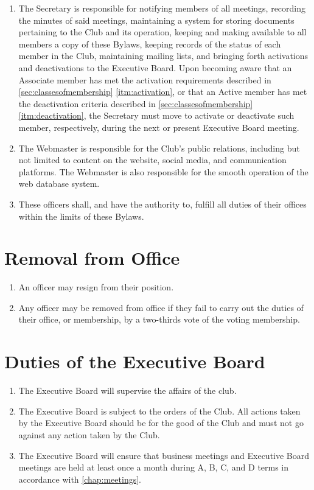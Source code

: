 \documentclass[12pt,letterpaper,oneside]{book}
\begin{document}
\begin{enumerate}
\item The Secretary is responsible for notifying members of all meetings, recording the minutes of said meetings, maintaining a system for storing documents pertaining to the Club and its operation, keeping and making available to all members a copy of these Bylaws, keeping records of the status of each member in the Club, maintaining mailing lists, and bringing forth activations and deactivations to the Executive Board. Upon becoming aware that an Associate member has met the activation requirements described in \cref{sec:classesofmembership} \cref{itm:activation}, or that an Active member has met the deactivation criteria described in \cref{sec:classesofmembership} \cref{itm:deactivation}, the Secretary must move to activate or deactivate such member, respectively, during the next or present Executive Board meeting.
\item The Webmaster is responsible for the Club’s public relations, including but not limited to content on the website, social media, and communication platforms. The Webmaster is also responsible for the smooth operation of the web database system.
\item These officers shall, and have the authority to, fulfill all duties of their offices within the limits of these Bylaws.

\end{enumerate}

\section{Removal from Office}

\begin{enumerate}

\item An officer may resign from their position.
\item Any officer may be removed from office if they fail to carry out the duties of their office, or membership, by a two-thirds vote of the voting membership.

\end{enumerate}

\section{Duties of the Executive Board}

\begin{enumerate}

\item The Executive Board will supervise the affairs of the club.
\item The Executive Board is subject to the orders of the Club. All actions taken by the Executive Board should be for the good of the Club and must not go against any action taken by the Club.
\item The Executive Board will ensure that business meetings and Executive Board meetings are held at least once a month during A, B, C, and D terms in accordance with \cref{chap:meetings}.

\end{enumerate}
\end{document}
